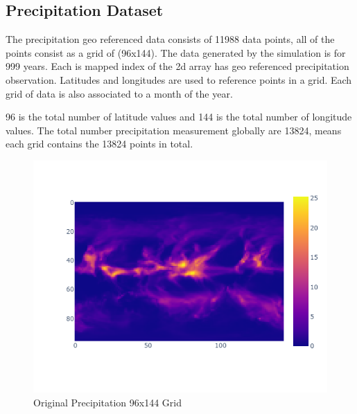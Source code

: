 \subsection{Precipitation Dataset}

The precipitation geo referenced data consists of 11988 data points, all of the points consist as a grid of (96x144). The data generated by the simulation is for 999 years.
Each is mapped index of the 2d array has geo referenced precipitation observation. Latitudes and longitudes are used to reference points in a grid.
Each grid of data is also associated to a month of the year.

96 is the total number of latitude values and 144 is the total number of longitude values. The total number precipitation measurement globally are 13824, means each grid contains the 13824 points in total.

\begin{figure}[H]
    \centering
    \includegraphics[width=0.6\linewidth]{figures/chapter-5/precipitation_raster.png}
    \caption{Original Precipitation 96x144 Grid }
    \label{fig:org_geopoth}
\end{figure}